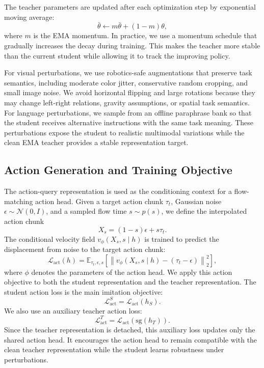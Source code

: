 \documentclass[letterpaper]{article} %
\begin{document}
The teacher parameters are updated after each optimization step by exponential moving average:
\begin{equation}
    \bar{\theta}
    \leftarrow
    m \bar{\theta}
    +
    (1-m)\theta,
\end{equation}
where $m$ is the EMA momentum. In practice, we use a momentum schedule that gradually increases the decay during training. This makes the teacher more stable than the current student while allowing it to track the improving policy.

For visual perturbations, we use robotics-safe augmentations that preserve task semantics, including moderate color jitter, conservative random cropping, and small image noise. We avoid horizontal flipping and large rotations because they may change left-right relations, gravity assumptions, or spatial task semantics. For language perturbations, we sample from an offline paraphrase bank so that the student receives alternative instructions with the same task meaning. These perturbations expose the student to realistic multimodal variations while the clean EMA teacher provides a stable representation target.

\subsection{Action Generation and Training Objective}

The action-query representation is used as the conditioning context for a flow-matching action head. Given a target action chunk $\tau_t$, Gaussian noise $\epsilon \sim \mathcal{N}(0,I)$, and a sampled flow time $s \sim p(s)$, we define the interpolated action chunk
\begin{equation}
    X_s = (1-s)\epsilon + s\tau_t.
\end{equation}
The conditional velocity field $v_\phi(X_s, s \mid h)$ is trained to predict the displacement from noise to the target action chunk:
\begin{equation}
    \mathcal{L}_{\mathrm{act}}(h)
    =
    \mathbb{E}_{\tau_t,\epsilon,s}
    \left[
    \left\|
    v_\phi(X_s, s \mid h)
    -
    (\tau_t-\epsilon)
    \right\|_2^2
    \right],
\end{equation}
where $\phi$ denotes the parameters of the action head. We apply this action objective to both the student representation and the teacher representation. The student action loss is the main imitation objective:
\begin{equation}
    \mathcal{L}_{\mathrm{act}}^{S}
    =
    \mathcal{L}_{\mathrm{act}}(h_S).
\end{equation}
We also use an auxiliary teacher action loss:
\begin{equation}
    \mathcal{L}_{\mathrm{act}}^{T}
    =
    \mathcal{L}_{\mathrm{act}}(\mathrm{sg}(h_T)).
\end{equation}
Since the teacher representation is detached, this auxiliary loss updates only the shared action head. It encourages the action head to remain compatible with the clean teacher representation while the student learns robustness under perturbations.
\end{document}
